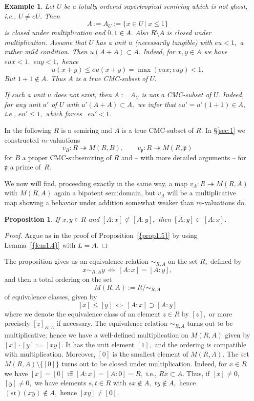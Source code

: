 \documentclass [12pt,a4paper,reqno]{amsart}
\newtheorem{prop}[thm]{Proposition}
\newtheorem{example}[thm]{Example}
\begin{document}
\begin{example}\label{examps4.3}
Let $U$ be a totally ordered supertropical semiring which is not
ghost, i.e., $U\ne eU.$ Then
$$A:=A_U:=\{x\in U {\ {|} \ }x\le 1\}$$
is closed under multiplication and $0,1\in A.$ Also $R\setminus A$
is closed under multiplication. Assume that $U$ has a unit $u$
(necessarily tangible) with $eu<1,$ a rather mild condition. Then
$u(A+A)\subset A .$ Indeed, for $x,y\in A$ we have $eux<1,$
$euy<1,$ hence
$$u(x+y) \leq  eu(x+y)=\max(eux;euy)<1.$$
But $1+1 \notin  A.$ Thus $A$ is a true CMC-subset of $U.$

If such a unit $u$ does not exist, then $A:=A_U$ is not a
CMC-subset of $U.$ Indeed, for any unit $u'$ of $U$ with
$u'(A+A)\subset A,$ we infer that $eu'=u'(1+1)\in A,$ i.e.,
$eu'\le 1,$ which forces~ $eu'<1.$\end{example}

In the following $R$ is a semiring and $A$ is a true CMC-subset of
$R.$ In \S\ref{sec:1} we constructed $m$-valuations
$$v_B: R\twoheadrightarrow M(R,B),\qquad v_{\mathfrak p}: R \twoheadrightarrow M(R,{\mathfrak p})$$
for $B$ a proper CMC-subsemiring of $R$ and -- with more detailed
arguments -- for ${\mathfrak p}$ a prime of~$R.$

We now will find, proceeding exactly in the same way, a map $v_A:
R\twoheadrightarrow M(R,A)$ with $M(R,A)$ again a bipotent
semidomain, but $v_A$ will be a multiplicative map showing a
behavior under addition somewhat weaker than $m$-valuations do.

\begin{prop}\label {prop4.4}
If $x,y\in R$ and $[A:x]\not\subset[A:y],$ then
$[A:y]\subset[A:x].$
\end{prop}

\begin{proof} Argue as in the proof of {Proposition~\ref{{prop1.5}}} by using
{Lemma~\ref{{lem1.4}}} with $L=A.$\end{proof}

The proposition gives us an equivalence relation $\sim_{R,A}$ on
the set $R,$ defined by
$$x\sim_{R,A}y \ \Leftrightarrow \ [A:x]=[A:y],$$
and then a total ordering on the set
$$M(R,A):=R/\sim_{R,A}$$
of equivalence classes, given by
$$[x]\le[y] \ \Leftrightarrow \ [A:x]\supset[A:y]$$
where we denote the equivalence class of an element $z\in R$ by
$[z],$ or more precisely $[z]_{R,A}$ if necessary. The equivalence
relation $\sim_{R,A}$ turns out to be multiplicative; hence we
have  a well-defined multiplication  on $M(R,A)$ given by
$[x]\cdot[y]:=[xy].$ It has the unit element $[1],$ and the
ordering is compatible with multiplication. Moreover, $[0]$ is the
smallest element of $M(R,A)$. The set $M(R,A)\setminus\{[0]\}$
turns out to be closed under multiplication. Indeed, for $x\in R$
we have $[x]=[0]$ iff $[A:x]=[A:0]=R,$ i.e., $Rx\subset A.$ Thus,
if $[x]\ne0,$ $[y]\ne0,$ we have elements $s,t\in R$ with
$sx\notin A,$ $ty\notin A,$ hence $(st)(xy)\notin A,$ hence
$[xy]\ne [0].$
\end{document}
